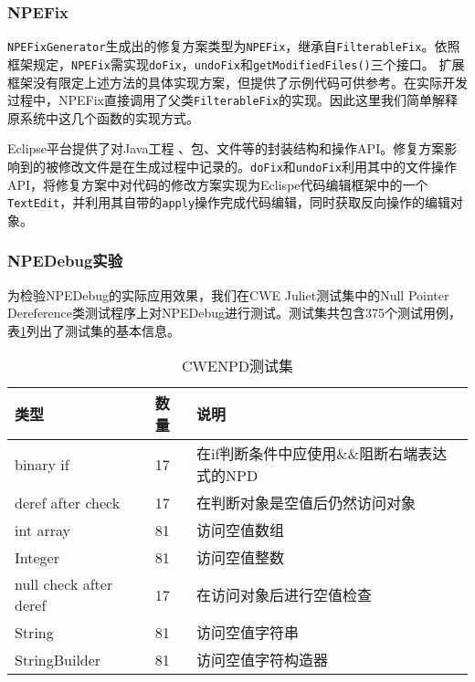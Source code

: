 \subsubsection{NPEFix}%
\texttt{NPEFixGenerator}生成出的修复方案类型为\texttt{NPEFix}，继承自\texttt{FilterableFix}。依照框架规定，\texttt{NPEFix}需实现\texttt{doFix}，\texttt{undoFix}和\texttt{getModifiedFiles()}三个接口。
扩展框架没有限定上述方法的具体实现方案，但提供了示例代码可供参考。在实际开发过程中，NPEFix直接调用了父类\texttt{FilterableFix}的实现。因此这里我们简单解释原系统中这几个函数的实现方式。

Eclipse平台提供了对Java工程 、包、文件等的封装结构和操作API。修复方案影响到的被修改文件是在生成过程中记录的。\texttt{doFix}和\texttt{undoFix}利用其中的文件操作API，将修复方案中对代码的修改方案实现为Eclispe代码编辑框架中的一个\texttt{TextEdit}，并利用其自带的\texttt{apply}操作完成代码编辑，同时获取反向操作的编辑对象。



\subsubsection{NPEDebug实验}%
为检验NPEDebug的实际应用效果，我们在CWE Juliet测试集中的Null Pointer Dereference类测试程序上对NPEDebug进行测试。测试集共包含375个测试用例，表\ref{tab:cwenpd}列出了测试集的基本信息。
\begin{table}
	\centering
	\caption{CWENPD测试集}
	\label{tab:cwenpd}
	\begin{tabular}{|l|l|l|}
		\hline
		类型                     & 数量 & 说明                         \\ \hline
		binary if              & 17 & 在if判断条件中应使用\&\&阻断右端表达式的NPD \\ \hline
		deref after check      & 17 & 在判断对象是空值后仍然访问对象            \\ \hline
		int array              & 81 & 访问空值数组                     \\ \hline
		Integer                & 81 & 访问空值整数                     \\ \hline
		null check after deref & 17 & 在访问对象后进行空值检查               \\ \hline
		String                 & 81 & 访问空值字符串                    \\ \hline
		StringBuilder          & 81 & 访问空值字符构造器                  \\ \hline
	\end{tabular}
\end{table}

